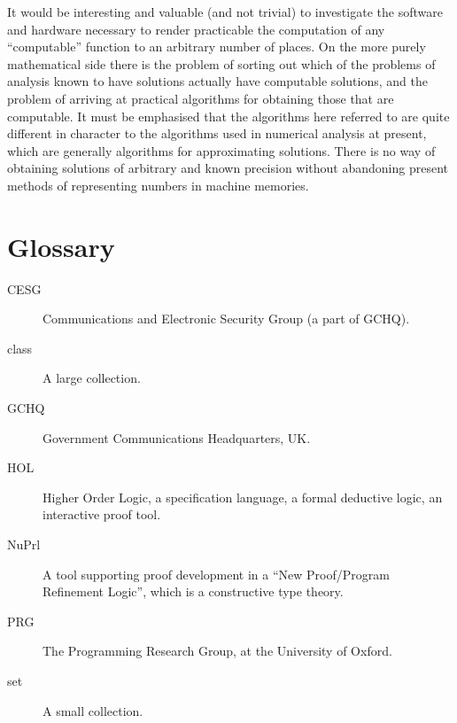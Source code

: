 \documentclass[10pt,titlepage]{book}
\begin{document}
It would be interesting and valuable (and not trivial) to investigate the software and hardware necessary to render practicable the computation of any ``computable'' function to an arbitrary number of places. On the more purely mathematical side there is the problem of sorting out which of the problems of analysis known to have solutions actually have computable solutions, and the problem of arriving at practical algorithms for obtaining those that are computable. It must be emphasised that the algorithms here referred to are quite different in character to the algorithms used in numerical analysis at present, which are generally algorithms for approximating solutions. There is no way of obtaining solutions of arbitrary and known precision without abandoning present methods of representing numbers in machine memories.

\chapter*{Glossary}\label{glossary}

\begin{description}
\item[CESG]{} Communications and Electronic Security Group (a part of GCHQ).
\item[class]{} A large collection.
\item[GCHQ]{} Government Communications Headquarters, UK.
\item[HOL]{} Higher Order Logic, a specification language, a formal deductive logic, an interactive proof tool.
\item[NuPrl]{} A tool supporting proof development in a ``New Proof/Program Refinement Logic'', which is a constructive type theory.
\item[PRG]{} The Programming Research Group, at the University of Oxford.
\item[set]{} A small collection.
\end{description}

\backmatter




\label{index}
\twocolumn[]
{\small\printindex}
\end{document}
